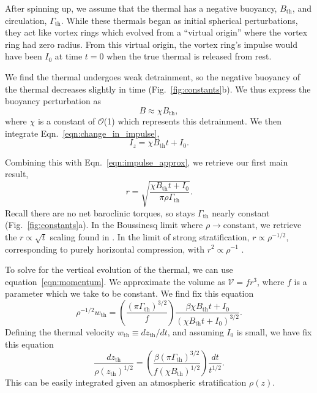 \documentclass[twocolumn, amsmath, amsfonts, amssymb, trackchanges]{aastex62}
\newcommand{\dl}[1]{{\color{blue} #1}}
\newcommand{\LJ}{\citetalias{lecoanet&jeevanjee2018}}
\begin{document}
After spinning up, we assume that the thermal has a negative buoyancy, $B_{\text{th}}$, and circulation, $\Gamma_{\text{th}}$.
While these thermals began as initial spherical perturbations, they act like vortex rings which evolved from a ``virtual origin'' where the vortex ring had zero radius.
From this virtual origin, the vortex ring's impulse would have been $I_0$ at time $t = 0$ when the true thermal is released from rest.

We find the thermal undergoes weak detrainment, so the negative buoyancy of the thermal decreases slightly in time (Fig.~\ref{fig:constants}b).
We thus express the buoyancy perturbation as 
\begin{equation}
B \approx \chi B_{\text{th}},
\end{equation}
where $\chi$ is a constant of $\mathcal{O}$(1) which represents this detrainment. 
We then integrate Eqn.~\ref{eqn:change_in_impulse},
\begin{equation*}
I_z = \chi B_{\text{th}} t + I_0.
\end{equation*}

Combining this with Eqn.~\ref{eqn:impulse_approx}, we retrieve our first main result,
\begin{equation}
r = \sqrt{\frac{\chi B_{\text{th}} t + I_0}{\pi\rho\Gamma_{\text{th}}}}.
\label{eqn:r_theory}
\end{equation}
Recall there are no net baroclinic torques, so stays $\Gamma_{\text{th}}$ nearly constant (Fig.~\ref{fig:constants}a).
In the Boussinesq limit where $\rho \rightarrow \text{constant}$, we retrieve the $r \propto \sqrt{t}$ scaling found in \LJ.
In the limit of strong stratification, $r \propto \rho^{-1/2}$, corresponding to purely horizontal compression, with $r^2 \propto \rho^{-1}$ \citep{brandenburg2016}.

To solve for the vertical evolution of the thermal, we can use equation~\ref{eqn:momentum}.
We approximate the volume as $\mathcal{V} = f r^3$, where $f$ is a parameter which we take to be constant.
We find \dl{fix this equation}
\begin{equation}
\rho^{-1/2} w_{\text{th}} = \left(\frac{(\pi \Gamma_{\text{th}})^{3/2}}{f}\right)\frac{\beta\chi B_{\text{th}} t + I_0}{(\chi B_{\text{th}} t + I_0)^{3/2}}.
\end{equation}
Defining the thermal velocity $w_{\text{th}} \equiv dz_{\text{th}}/dt$, and assuming $I_0$ is small, we have \dl{fix this equation}
\begin{equation}
\frac{dz_{\text{th}}}{\rho(z_{\text{th}})^{1/2}} =
\left(\frac{\beta(\pi\Gamma_{\text{th}})^{3/2}}{f(\chi B_{\text{th}})^{1/2}}\right)\frac{dt}{t^{1/2}}.
\label{eqn:dz_theory}
\end{equation}
This can be easily integrated given an atmospheric stratification $\rho(z)$.
\end{document}
